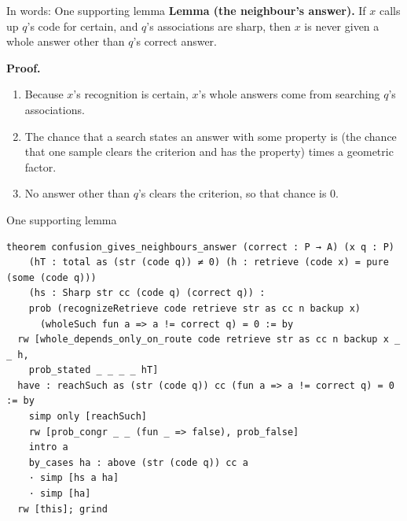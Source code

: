 \documentclass[aspectratio=169,11pt]{beamer}
\begin{document}
\begin{frame}{In words: One supporting lemma}
  \textbf{Lemma (the neighbour's answer).} If $x$ calls up $q$'s code for certain, and $q$'s associations are sharp, then $x$ is never given a whole answer other than $q$'s correct answer.
  \bigskip

  \textbf{Proof.}
  \begin{enumerate}
    \item Because $x$'s recognition is certain, $x$'s whole answers come from searching $q$'s associations.
    \item The chance that a search states an answer with some property is (the chance that one sample clears the criterion and has the property) times a geometric factor.
    \item No answer other than $q$'s clears the criterion, so that chance is 0.
  \end{enumerate}
\end{frame}


\begin{frame}[fragile]{One supporting lemma}
\begin{Verbatim}
theorem confusion_gives_neighbours_answer (correct : P → A) (x q : P)
    (hT : total as (str (code q)) ≠ 0) (h : retrieve (code x) = pure (some (code q)))
    (hs : Sharp str cc (code q) (correct q)) :
    prob (recognizeRetrieve code retrieve str as cc n backup x)
      (wholeSuch fun a => a != correct q) = 0 := by
  rw [whole_depends_only_on_route code retrieve str as cc n backup x _ _ h,
    prob_stated _ _ _ _ hT]
  have : reachSuch as (str (code q)) cc (fun a => a != correct q) = 0 := by
    simp only [reachSuch]
    rw [prob_congr _ _ (fun _ => false), prob_false]
    intro a
    by_cases ha : above (str (code q)) cc a
    · simp [hs a ha]
    · simp [ha]
  rw [this]; grind
\end{Verbatim}
\end{frame}
\end{document}
